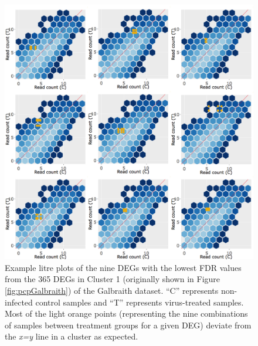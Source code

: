 \documentclass[11pt,a4paper,oldfontcommands,openany]{memoir}
\numberwithin{equation}{section} %
\begin{document}
\begin{figure}[H]
\begin{framed}
  \includegraphics[width=\textwidth]{Images/litreCluster1}
\end{framed}
  \caption{Example litre plots of the nine DEGs with the lowest FDR values from the 365 DEGs in Cluster 1 (originally shown in Figure \ref{fig:pcpGalbraith}) of the Galbraith dataset. ``C'' represents non-infected control samples and ``T'' represents virus-treated samples. Most of the light orange points (representing the nine combinations of samples between treatment groups for a given DEG) deviate from the \textit{x=y} line in a cluster as expected.}
  \label{fig:litreCluster1}
\end{figure}
\end{document}
